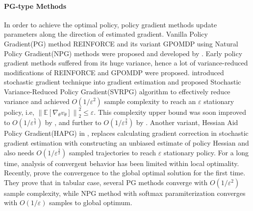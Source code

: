\documentclass{article}
\numberwithin{equation}{section}
\begin{document}
\paragraph{PG-type Methods} In order to achieve the optimal policy, policy gradient methods update parameters along the direction of estimated gradient. Vanilla Policy Gradient(PG) method REINFORCE and its variant GPOMDP using Natural Policy Gradient(NPG) methods were proposed and developed by \cite{williams1992simple, sutton2000policy, kakade2001natural}. Early policy gradient methods suffered from its huge variance, hence a lot of variance-reduced modifications of REINFORCE and GPOMDP were proposed. 
\cite{papini2018stochastic} introduced stochastic gradient technique into gradient estimation and proposed Stochastic Variance-Reduced Policy Gradient(SVRPG) algorithm to effectively reduce variance and achieved $O(1/\varepsilon^2)$ sample complexity to reach an $\varepsilon$ stationary policy, i.e, $\left\|\mathbb{E} [\nabla_{\theta} v_{\theta}]\right\|_2^2 \leq \varepsilon.$ This complexity upper bound was soon improved to $O(1/\varepsilon^{\frac{5}{3}})$ by \cite{xu2020improved}, and further to $O(1/\varepsilon^{\frac{3}{2}})$ by \cite{xu2019sample}. Another variant, Hessian Aid Policy Gradient(HAPG) in \cite{shen2019hessian}, replaces calculating gradient correction in stochastic gradient estimation with constructing an unbiased estimate of policy Hessian and also needs $O(1/\varepsilon^{\frac{3}{2}})$ sampled trajectories to reach $\varepsilon$ stationary policy. For a long time, analysis of convergent behavior has been limited within local optimality. Recently, \cite{agarwal2021theory} prove the convergence to the global optimal solution for the first time. They prove that in tabular case, several PG methods converge with $O(1/\varepsilon^2)$ sample complexity, while NPG method with softmax paramiterization converges with $O(1/\varepsilon)$ samples to global optimum. 
\end{document}
